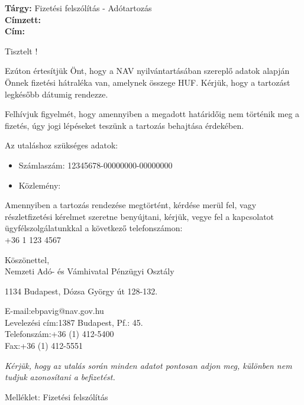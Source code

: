 \documentclass[a4paper,12pt]{letter}
\begin{document}
    
    \begin{flushleft}
        \textbf{Tárgy:} Fizetési felszólítás - Adótartozás \\ [1em] 
        \textbf{Címzett:} \nev \\ [1em] 
        \textbf{Cím:} \cim
    \end{flushleft}
    
    \vspace{1.5em}
    
    Tisztelt \nev!
    
    Ezúton értesítjük Önt, hogy a NAV nyilvántartásában szereplő adatok alapján Önnek fizetési hátraléka van, amelynek összege \osszeg HUF. Kérjük, hogy a tartozást legkésőbb \hatarido dátumig rendezze.
    
    Felhívjuk figyelmét, hogy amennyiben a megadott határidőig nem történik meg a fizetés, úgy jogi lépéseket teszünk a tartozás behajtása érdekében.
    
    Az utaláshoz szükséges adatok:
    \begin{itemize}
        \item Számlaszám: 12345678-00000000-00000000
        \item Közlemény: \kozlemeny
    \end{itemize}
    
    Amennyiben a tartozás rendezése megtörtént, kérdése merül fel, vagy részletfizetési kérelmet szeretne benyújtani, kérjük, vegye fel a kapcsolatot ügyfélszolgálatunkkal a következő telefonszámon: \\
    +36 1 123 4567
    
    Köszönettel,\\
    Nemzeti Adó- és Vámhivatal Pénzügyi Osztály \\
    \signature{Nemzeti Adó- és Vámhivatal Pénzügyi Osztály}
    1134 Budapest, Dózsa György út 128-132. \\
    \address{NAV Központi Hivatal, 1134 Budapest, Dózsa György út 128-132. }
     E-mail:ebpavig@nav.gov.hu \\Levelezési cím:1387 Budapest, Pf.: 45. \\Telefonszám:+36 (1) 412-5400 \\Fax:+36 (1) 412-5551
    \date{\today}
    
    \vspace{1.5em}
    \textit{Kérjük, hogy az utalás során minden adatot pontosan adjon meg, különben nem tudjuk azonosítani a befizetést.}
    
    \vspace{1em}
    Melléklet: Fizetési felszólítás
    
    
\end{document}

